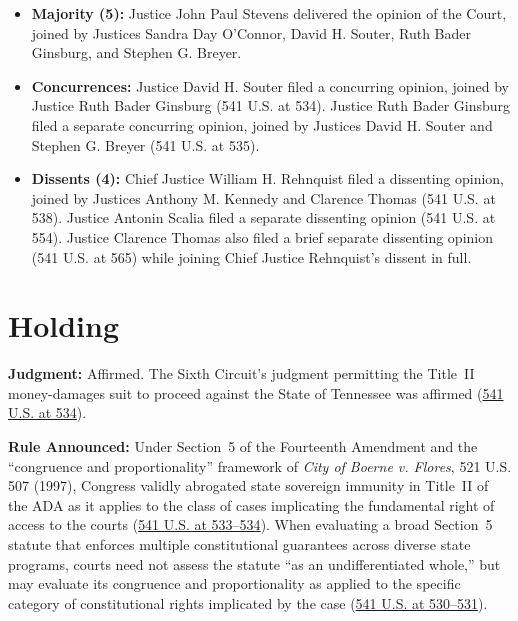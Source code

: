 \documentclass[12pt]{article}
\begin{document}
\begin{itemize}
    \item \textbf{Majority (5):} Justice John Paul Stevens delivered the opinion of the Court, joined by Justices Sandra Day O'Connor, David H. Souter, Ruth Bader Ginsburg, and Stephen G. Breyer.
    \item \textbf{Concurrences:} Justice David H. Souter filed a concurring opinion, joined by Justice Ruth Bader Ginsburg (541 U.S. at 534). Justice Ruth Bader Ginsburg filed a separate concurring opinion, joined by Justices David H. Souter and Stephen G. Breyer (541 U.S. at 535).
    \item \textbf{Dissents (4):} Chief Justice William H. Rehnquist filed a dissenting opinion, joined by Justices Anthony M. Kennedy and Clarence Thomas (541 U.S. at 538). Justice Antonin Scalia filed a separate dissenting opinion (541 U.S. at 554). Justice Clarence Thomas also filed a brief separate dissenting opinion (541 U.S. at 565) while joining Chief Justice Rehnquist's dissent in full.
\end{itemize}

\section{Holding}
\textbf{Judgment:} Affirmed. The Sixth Circuit's judgment permitting the Title~II money-damages suit to proceed against the State of Tennessee was affirmed (\href{https://www.law.cornell.edu/supremecourt/text/541/509}{541 U.S. at 534}).

\textbf{Rule Announced:} Under Section~5 of the Fourteenth Amendment and the ``congruence and proportionality'' framework of \textit{City of Boerne v. Flores}, 521 U.S. 507 (1997), Congress validly abrogated state sovereign immunity in Title~II of the ADA as it applies to the class of cases implicating the fundamental right of access to the courts (\href{https://www.law.cornell.edu/supremecourt/text/541/509}{541 U.S. at 533--534}). When evaluating a broad Section~5 statute that enforces multiple constitutional guarantees across diverse state programs, courts need not assess the statute ``as an undifferentiated whole,'' but may evaluate its congruence and proportionality as applied to the specific category of constitutional rights implicated by the case (\href{https://www.law.cornell.edu/supremecourt/text/541/509}{541 U.S. at 530--531}).
\end{document}
